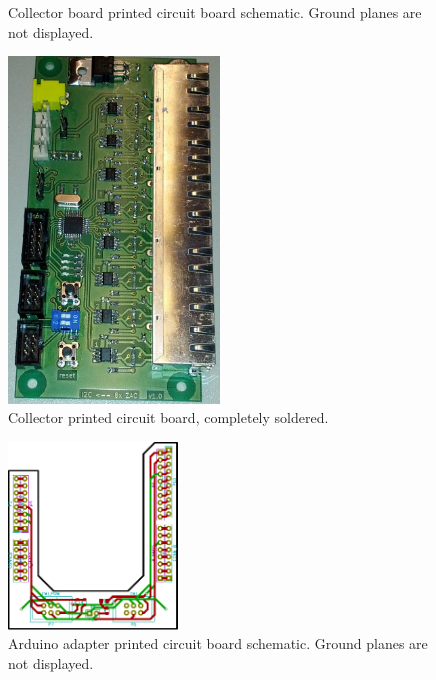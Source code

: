 \documentclass[a4paper]{scrreprt}
\begin{document}
\begin{appendices}
\begin{figure}[Hh!]
	\caption{Collector board printed circuit board schematic. Ground planes are not displayed.}
	\label{fig:pcb_collector} 
\end{figure}
\begin{figure}[Hh!]
	\centering
	\includegraphics[width=0.5\textwidth]{img/boards/collector_complete.jpg}
	\caption{Collector printed circuit board, completely soldered.}
	\label{fig:soldered_col}
\end{figure}
\begin{figure}[Hh!]
	\centering
	\includegraphics[width=0.4\textwidth]{img/boards/arduino_kicad.pdf}
	\caption{Arduino adapter printed circuit board schematic. Ground planes are not displayed.}
	\label{fig:pcb_arduino} 
\end{figure}


\end{appendices}
\end{document}
